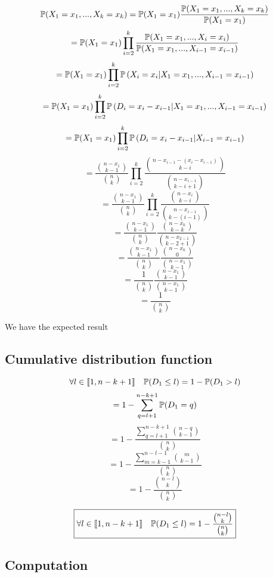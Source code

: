 		\[\mathbb{P}(X_1 = x_1, ..., X_k = x_k) = \mathbb{P}(X_1 = x_1)\frac{\mathbb{P}(X_1 = x_1, ..., X_k = x_k)}{\mathbb{P}(X_1 = x_1)}\]
		\[= \mathbb{P}(X_1 = x_1)\prod_{i = 2}^{k}{\frac{\mathbb{P}(X_1 = x_1, ..., X_i = x_i)}{\mathbb{P}(X_1 = x_1, ..., X_{i - 1} = x_{i - 1})}}\]
		\[= \mathbb{P}(X_1 = x_1)\prod_{i = 2}^{k}{\mathbb{P}\left(X_i = x_i | X_1 = x_1, ..., X_{i - 1} = x_{i - 1}\right)}\]
		\[= \mathbb{P}(X_1 = x_1)\prod_{i = 2}^{k}{\mathbb{P}\left(D_i = x_i - x_{i - 1} | X_1 = x_1, ..., X_{i - 1} = x_{i - 1}\right)}\]
		\[= \mathbb{P}(X_1 = x_1)\prod_{i = 2}^{k}{\mathbb{P}\left(D_i = x_i - x_{i - 1} | X_{i - 1} = x_{i - 1}\right)}\]
		\[= \frac{\binom{n - x_1}{k - 1}}{\binom{n}{k}}\prod_{i = 2}^{k}{\frac{\binom{n - x_{i - 1} - (x_i - x_{i - 1})}{k - i}}{\binom{n - x_{i - 1}}{k - i + 1}}}\]
		\[= \frac{\binom{n - x_1}{k - 1}}{\binom{n}{k}}\prod_{i = 2}^{k}{\frac{\binom{n  - x_i }{k - i}}{\binom{n - x_{i - 1}}{k - (i - 1)}}}\]
		\[= \frac{\binom{n - x_1}{k - 1}}{\binom{n}{k}}\frac{\binom{n  - x_k }{k - k}}{\binom{n - x_{2 - 1}}{k - 2 + 1}}\]
		\[= \frac{\binom{n - x_1}{k - 1}}{\binom{n}{k}}\frac{\binom{n  - x_k }{0}}{\binom{n - x_1}{k - 1}}\]
		\[= \frac{1}{\binom{n}{k}}\frac{\binom{n - x_1}{k - 1}}{\binom{n - x_1}{k - 1}}\]
		\[= \frac{1}{\binom{n}{k}}\]
		
		We have the expected result
		
	
\subsection{Cumulative distribution function}
	\[\forall l\in\llbracket1, n - k + 1\rrbracket\quad \mathbb{P}(D_1\leq l) = 1 - \mathbb{P}(D_1 > l)\]
	\[ = 1 - \sum_{q = l + 1}^{n - k + 1}{\mathbb{P}(D_1 = q)}\]
	\[ = 1 - \frac{\sum_{q = l + 1}^{n - k + 1}{\binom{n - q}{k - 1}}}{\binom{n}{k}}\]
	\[ = 1 - \frac{\sum_{m = k - 1}^{n - l - 1}{\binom{m}{k - 1}}}{\binom{n}{k}}\]
	\[ = 1 - \frac{\binom{n - l}{k}}{\binom{n}{k}}\]
	
	\[\boxed{\forall l\in\llbracket1, n - k + 1\rrbracket\quad \mathbb{P}(D_1\leq l) = 1 -\frac{\binom{n - l}{k}}{\binom{n}{k}}}\]
\subsection{Computation}
